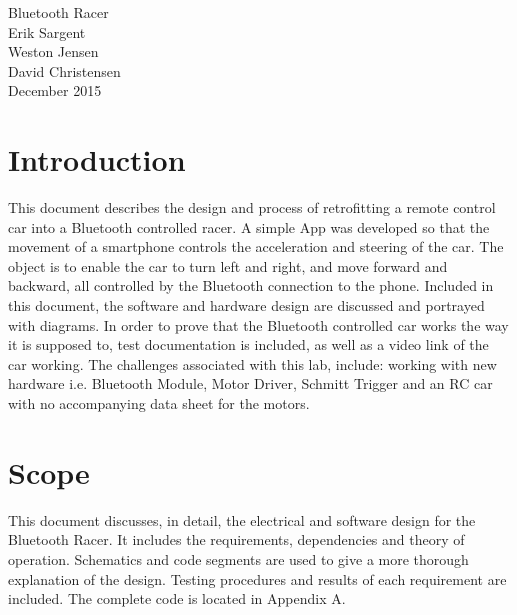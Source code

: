 \documentclass[12pt]{article}
\begin{document}
\begin{titlepage}
\vspace*{\fill}
\begin {center}
\Huge Bluetooth Racer\\


\Large Erik Sargent\\
\Large Weston Jensen\\
\Large David Christensen\\
December 2015\\
\end {center}
\vspace*{\fill}

\end{titlepage}


\tableofcontents
\listoffigures
\listoftables
\newpage

\section{Introduction}

This document describes the design and process of retrofitting a remote control car into a Bluetooth controlled racer. A simple App was developed so that the movement of a smartphone controls the acceleration and steering of the car. The object is to enable the car to turn left and right, and move forward and backward, all controlled by the Bluetooth connection to the phone. Included in this document, the software and hardware design are discussed and portrayed with diagrams. In order to prove that the Bluetooth controlled car works the way it is supposed to, test documentation is included, as well as a video link of the car working. The challenges associated with this lab, include: working with new hardware i.e. Bluetooth Module, Motor Driver, Schmitt Trigger and an RC car with no accompanying data sheet for the motors.\\

\section{Scope}
This document discusses, in detail, the electrical and software design for the Bluetooth Racer. It includes the requirements, dependencies and theory of operation. Schematics and code segments are used to give a more thorough explanation of the design. Testing procedures and results of each requirement are included. The complete code is located in Appendix A.\\
\end{document}
